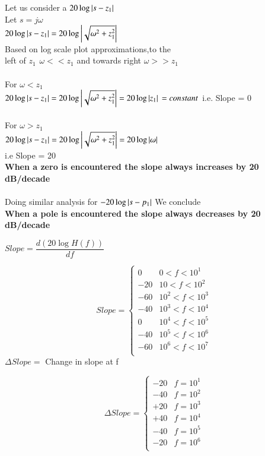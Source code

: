 \begin{left}


Let us consider a $ 20\log \left\vert s-z_{1}\right\vert $
\\
Let $s = j\omega$
\\
$ 20\log \left\vert s-z_{1}\right\vert = 20\log \left\vert\sqrt{\omega^{2} + z_{1}^{2}}\right\vert $
\\
Based on log scale plot approximations,to the 
\\
left of $z_{1} \hspace{5pt} \omega << z_{1} $ and towards right  $ \omega >> z_{1} $
\\ \\
For $\omega < z_{1}$
\\
$ 20\log \left\vert s-z_{1}\right\vert = 20\log \left\vert\sqrt{\omega^{2} + z_{1}^{2}}\right\vert = 20 \log \left\vert z_{1}\right\vert 
\\
= constant $ i.e. Slope = 0
\\
\\
For $\omega > z_{1}$
\\
$ 20\log \left\vert s-z_{1}\right\vert = 20\log \left\vert\sqrt{\omega^{2} + z_{1}^{2}}\right\vert = 20 \log \left\vert\omega\right\vert $
\\
i.e Slope = 20
\\
\textbf{When a zero is encountered the slope always increases by 20 dB/decade}
\\
\\
Doing similar analysis for $ - 20\log \left\vert s-p_{1}\right\vert $  We conclude
\\
\textbf{When a pole is encountered the slope always decreases by 20 dB/decade}
\\
\end{left}

$Slope = \dfrac{d(20\log H(f))}{df}$

\[ Slope = \begin{cases} 
        0 & 0 < f < 10^{1} \\
      -20 & 10 < f < 10^{2} \\
      -60 & 10^{2} < f < 10^{3} \\
      -40 & 10^{3} < f < 10^{4} \\
       0 & 10^{4} < f < 10^{5} \\
      -40 & 10^{5} < f < 10^{6} \\
      -60 & 10^{6} < f < 10^{7} \\
      
   \end{cases}
\]
$ \Delta Slope = $ Change in slope at f

\[  \Delta Slope = \begin{cases} 
      -20 &  f = 10^{1} \\
      -40 &  f = 10^{2} \\
      +20 &  f = 10^{3} \\
      +40 &  f = 10^{4} \\
      -40 &  f = 10^{5} \\
      -20 &  f = 10^{6} \\
      
      
   \end{cases}
\]


